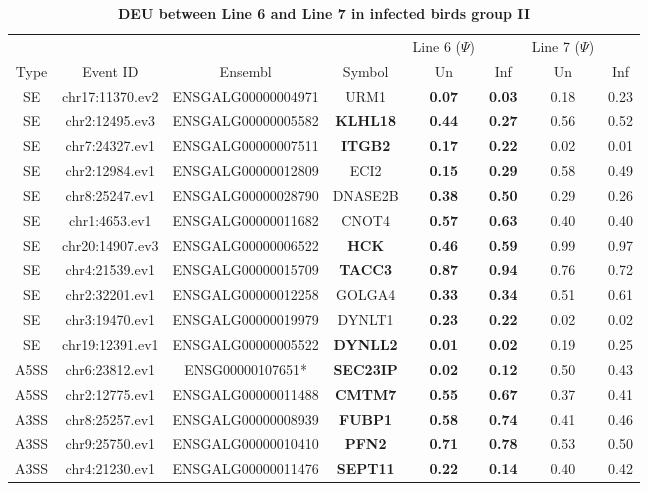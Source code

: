 \documentclass[10pt]{article}
\begin{document}
\begin{table}[!ht]
\caption{
\bf{DEU between Line 6 and Line 7 in infected birds group II}}
\begin{tabular}{cccccccc}
\hline
& & & & Line 6 ($\Psi$) & & Line 7 ($\Psi$) & \\
Type & Event ID & Ensembl & Symbol  & Un & Inf & Un & Inf \\
\hline
SE & chr17:11370.ev2 & ENSGALG00000004971 & URM1 & \textbf{0.07} & \textbf{0.03} & 0.18 & 0.23 \\
SE & chr2:12495.ev3 & ENSGALG00000005582 & \textbf{KLHL18} & \textbf{0.44} & \textbf{0.27} & 0.56 & 0.52 \\
SE & chr7:24327.ev1 & ENSGALG00000007511 & \textbf{ITGB2} & \textbf{0.17} & \textbf{0.22} & 0.02 & 0.01 \\
SE & chr2:12984.ev1 & ENSGALG00000012809 & ECI2 & \textbf{0.15} & \textbf{0.29} & 0.58 & 0.49 \\
SE & chr8:25247.ev1 & ENSGALG00000028790 & DNASE2B & \textbf{0.38} & \textbf{0.50} & 0.29 & 0.26 \\
SE & chr1:4653.ev1 & ENSGALG00000011682 & CNOT4 & \textbf{0.57} & \textbf{0.63} & 0.40 & 0.40 \\
SE & chr20:14907.ev3 & ENSGALG00000006522 & \textbf{HCK} & \textbf{0.46} & \textbf{0.59} & 0.99 & 0.97 \\
SE & chr4:21539.ev1 & ENSGALG00000015709 & \textbf{TACC3} & \textbf{0.87} & \textbf{0.94} & 0.76 & 0.72 \\
SE & chr2:32201.ev1 & ENSGALG00000012258 & GOLGA4 & \textbf{0.33} & \textbf{0.34} & 0.51 & 0.61 \\
SE & chr3:19470.ev1 & ENSGALG00000019979 & DYNLT1 & \textbf{0.23} & \textbf{0.22} & 0.02 & 0.02 \\
SE & chr19:12391.ev1 & ENSGALG00000005522 & \textbf{DYNLL2} & \textbf{0.01} & \textbf{0.02} & 0.19 & 0.25 \\
A5SS & chr6:23812.ev1 & ENSG00000107651* & \textbf{SEC23IP} & \textbf{0.02} & \textbf{0.12} & 0.50 & 0.43 \\
A5SS & chr2:12775.ev1 & ENSGALG00000011488 & \textbf{CMTM7} & \textbf{0.55} & \textbf{0.67} & 0.37 & 0.41 \\
A3SS & chr8:25257.ev1 & ENSGALG00000008939 & \textbf{FUBP1} & \textbf{0.58} & \textbf{0.74} & 0.41 & 0.46 \\
A3SS & chr9:25750.ev1 & ENSGALG00000010410 & \textbf{PFN2} & \textbf{0.71} & \textbf{0.78} & 0.53 & 0.50 \\
A3SS & chr4:21230.ev1 & ENSGALG00000011476 & \textbf{SEPT11} & \textbf{0.22} & \textbf{0.14} & 0.40 & 0.42 \\

\end{tabular}
\end{table}
\end{document}
